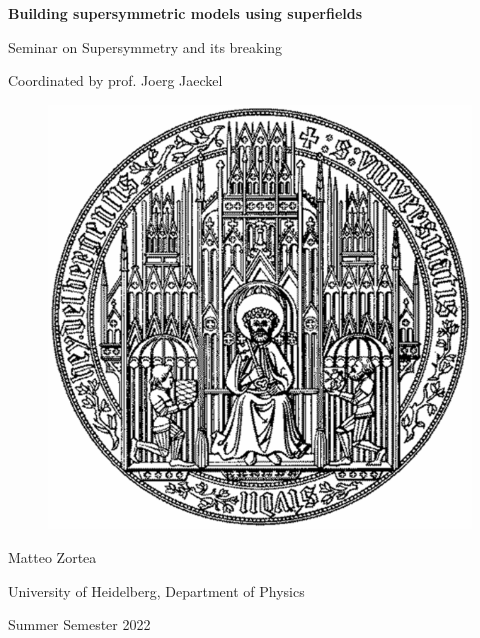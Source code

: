 \documentclass[12pt]{article}
\begin{document}
\thispagestyle{empty}

\centerline{\Large\bfseries Building supersymmetric models using superfields}
\vspace{10pt}
\centerline{\large Seminar on Supersymmetry and its breaking}
\vspace{10pt}
\centerline{Coordinated by prof. Joerg Jaeckel}

\vspace{30pt}

\begin{figure}[h]
  \centering
  \includegraphics[scale=0.3]{images/uniheilogo.png}
\end{figure}
\vspace{30pt}


\centerline{\Large Matteo Zortea}
\vspace{10pt}
\centerline{University of Heidelberg, Department of Physics}
\vspace{10pt}
\centerline{Summer Semester 2022}


\vspace{50pt}
{
  \hypersetup{linkcolor=black}
  \tableofcontents
}

\newpage
\end{document}
